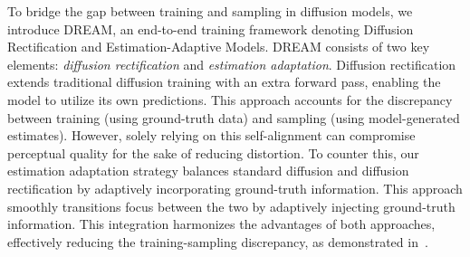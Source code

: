 To bridge the gap between training and sampling in diffusion models, we introduce DREAM, an end-to-end training framework denoting Diffusion Rectification and Estimation-Adaptive Models. DREAM consists of two key elements: \emph{diffusion rectification} and \emph{estimation adaptation}. Diffusion rectification extends traditional diffusion training with an extra forward pass, enabling the model to utilize its own predictions. This approach accounts for the discrepancy between training (using ground-truth data) and sampling (using model-generated estimates). However, solely relying on this self-alignment can compromise perceptual quality for the sake of reducing distortion. To counter this, our estimation adaptation strategy balances standard diffusion and diffusion rectification by adaptively incorporating ground-truth information.  This approach smoothly transitions focus between the two by adaptively injecting ground-truth information. This integration harmonizes the advantages of both approaches, effectively reducing the training-sampling discrepancy, as demonstrated in~.


